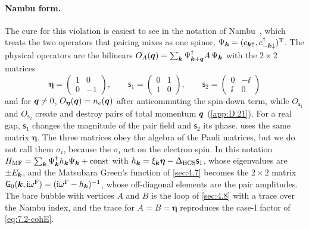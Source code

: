 \paragraph{Nambu form.} The cure for this violation is easiest to see in the notation of Nambu~\cite{nambu1960quasi}, which treats the two operators that pairing mixes as one spinor, $\Psi_{\bm{k}} = (c_{\bm{k}\uparrow}, c^\dagger_{-\bm{k}\downarrow})^{\mathrm{T}}$. The physical operators are the bilinears $O_A(\bm{q}) = \sum_{\bm{k}}\Psi^\dagger_{\bm{k}+\bm{q}}A\,\Psi_{\bm{k}}$ with the $2\times2$ matrices
\begin{equation}
  \boldsymbol{\eta} = \begin{pmatrix}1 & 0\\ 0 & -1\end{pmatrix}, \qquad
  \mathsf{s}_1 = \begin{pmatrix}0 & 1\\ 1 & 0\end{pmatrix}, \qquad
  \mathsf{s}_2 = \begin{pmatrix}0 & -\ii\\ \ii & 0\end{pmatrix}
  \label{eq:7.2-nambu}
\end{equation}
and for $\bm{q} \ne 0$, $O_{\boldsymbol{\eta}}(\bm{q}) = n_e(\bm{q})$ after anticommuting the spin-down term, while $O_{\mathsf{s}_1}$ and $O_{\mathsf{s}_2}$ create and destroy pairs of total momentum $\bm{q}$ (\cref{app:D.21}). For a real gap, $\mathsf{s}_1$ changes the magnitude of the pair field and $\mathsf{s}_2$ its phase.  uses the same matrix $\boldsymbol{\eta}$. The three matrices obey the algebra of the Pauli matrices, but we do not call them $\sigma_i$, because the $\sigma_i$ act on the electron spin. In this notation $H_{\mathrm{MF}} = \sum_{\bm{k}}\Psi^\dagger_{\bm{k}}h_{\bm{k}}\Psi_{\bm{k}} + \text{const}$ with $h_{\bm{k}} = \xi_{\bm{k}}\boldsymbol{\eta} - \Delta_{\mathrm{BCS}}\mathsf{s}_1$, whose eigenvalues are $\pm E_{\bm{k}}$, and the Matsubara Green's function of \cref{sec:4.7} becomes the $2\times2$ matrix $\mathsf{G}_0(\bm{k},\mathrm{i}\omega^{\mathrm{F}}) = (\mathrm{i}\omega^{\mathrm{F}} - h_{\bm{k}})^{-1}$, whose off-diagonal elements are the pair amplitudes. The bare bubble with vertices $A$ and $B$ is the loop of \cref{sec:4.8} with a trace over the Nambu index, and the trace for $A = B = \boldsymbol{\eta}$ reproduces the case-I factor of \cref{eq:7.2-cohE}.

